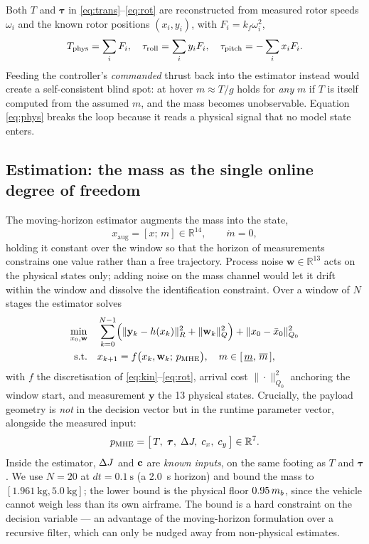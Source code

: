 Both $T$ and $\boldsymbol{\tau}$ in \eqref{eq:trans}--\eqref{eq:rot} are
reconstructed from measured rotor speeds $\omega_i$ and the known rotor
positions $(x_i, y_i)$, with $F_i = k_f \omega_i^2$,
\begin{equation}
T_{\mathrm{phys}} = \sum_i F_i, \quad
\tau_{\mathrm{roll}} = \sum_i y_i F_i, \quad
\tau_{\mathrm{pitch}} = -\sum_i x_i F_i .
\label{eq:phys}
\end{equation}
Feeding the controller's \emph{commanded} thrust back into the estimator
instead would create a self-consistent blind spot: at hover
$m \approx T/g$ holds for \emph{any} $m$ if $T$ is itself computed from the
assumed $m$, and the mass becomes unobservable. Equation \eqref{eq:phys}
breaks the loop because it reads a physical signal that no model state
enters.

\subsection{Estimation: the mass as the single online degree of freedom}\label{sec:model:mhe}

The moving-horizon estimator augments the mass into the state,
\begin{equation}
x_{\mathrm{aug}} = [x;\, m] \in \mathbb{R}^{14}, \qquad \dot m = 0,
\label{eq:xaug}
\end{equation}
holding it constant over the window so that the horizon of measurements
constrains one value rather than a free trajectory. Process noise
$\mathbf{w} \in \mathbb{R}^{13}$ acts on the physical states only; adding
noise on the mass channel would let it drift within the window and dissolve
the identification constraint. Over a window of $N$ stages the estimator
solves
\begin{align}
\min_{x_{0}, \mathbf{w}} \quad
& \sum_{k=0}^{N-1} \Bigl( \| \mathbf{y}_k - h(x_k) \|^2_{R} + \| \mathbf{w}_k \|^2_{Q} \Bigr)
+ \| x_0 - \bar{x}_0 \|^2_{Q_0} \nonumber \\
\text{s.t.} \quad & x_{k+1} = f\bigl(x_k, \mathbf{w}_k;\, p_{\mathrm{MHE}}\bigr), \quad
m \in [\,\underline{m},\, \overline{m}\,],
\label{eq:mhe}
\end{align}
with $f$ the discretisation of \eqref{eq:kin}--\eqref{eq:rot}, arrival cost
$\| \cdot \|^2_{Q_0}$ anchoring the window start, and measurement
$\mathbf{y}$ the 13 physical states. Crucially, the payload geometry is
\emph{not} in the decision vector but in the runtime parameter vector,
alongside the measured input:
\begin{equation}
p_{\mathrm{MHE}} = \bigl[\, T,\; \boldsymbol{\tau},\; \Delta J,\; c_x,\; c_y \,\bigr] \in \mathbb{R}^{7}.
\label{eq:pmhe}
\end{equation}
Inside the estimator, $\Delta J$ and $\mathbf{c}$ are \emph{known inputs}, on the
same footing as $T$ and $\boldsymbol{\tau}$. We use $N = 20$ at
$dt = \SI{0.1}{\second}$ (a \SI{2.0}{\second} horizon) and bound the mass
to $[\SI{1.961}{\kg}, \SI{5.0}{\kg}]$; the lower bound is the physical
floor $0.95\,m_b$, since the vehicle cannot weigh less than its own
airframe. The bound is a hard constraint on the decision variable --- an
advantage of the moving-horizon formulation over a recursive filter, which
can only be nudged away from non-physical estimates.

